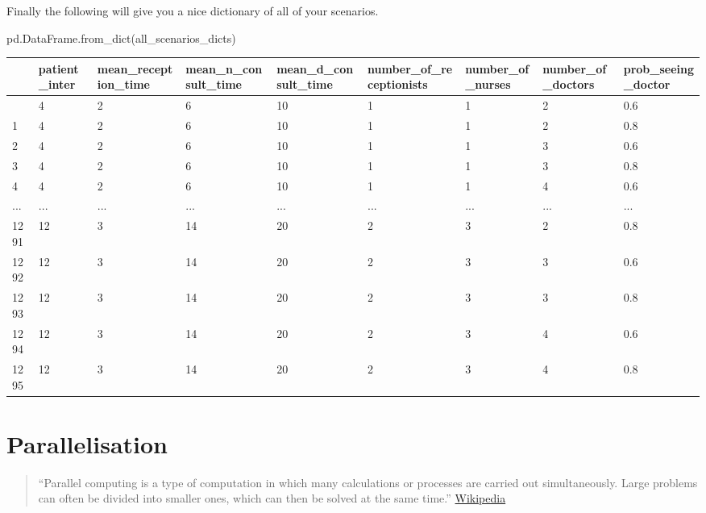 \documentclass[
  letterpaper,
  DIV=11,
  numbers=noendperiod]{scrreprt}
\newenvironment{Shaded}{}{}
\newcommand{\NormalTok}[1]{\textcolor[rgb]{0.14,0.16,0.18}{#1}}
\begin{document}
Finally the following will give you a nice dictionary of all of your
scenarios.

\begin{Shaded}
\begin{Highlighting}[]
\NormalTok{pd.DataFrame.from\_dict(all\_scenarios\_dicts)}
\end{Highlighting}
\end{Shaded}

\begin{longtable}[]{@{}lllllllll@{}}
\toprule\noalign{}
& patient\_inter & mean\_reception\_time & mean\_n\_consult\_time &
mean\_d\_consult\_time & number\_of\_receptionists & number\_of\_nurses
& number\_of\_doctors & prob\_seeing\_doctor \\
\midrule\noalign{}
\endhead
\bottomrule\noalign{}
\endlastfoot
0 & 4 & 2 & 6 & 10 & 1 & 1 & 2 & 0.6 \\
1 & 4 & 2 & 6 & 10 & 1 & 1 & 2 & 0.8 \\
2 & 4 & 2 & 6 & 10 & 1 & 1 & 3 & 0.6 \\
3 & 4 & 2 & 6 & 10 & 1 & 1 & 3 & 0.8 \\
4 & 4 & 2 & 6 & 10 & 1 & 1 & 4 & 0.6 \\
... & ... & ... & ... & ... & ... & ... & ... & ... \\
1291 & 12 & 3 & 14 & 20 & 2 & 3 & 2 & 0.8 \\
1292 & 12 & 3 & 14 & 20 & 2 & 3 & 3 & 0.6 \\
1293 & 12 & 3 & 14 & 20 & 2 & 3 & 3 & 0.8 \\
1294 & 12 & 3 & 14 & 20 & 2 & 3 & 4 & 0.6 \\
1295 & 12 & 3 & 14 & 20 & 2 & 3 & 4 & 0.8 \\
\end{longtable}

\chapter{Parallelisation}\label{parallelisation}

\begin{quote}
``Parallel computing is a type of computation in which many calculations
or processes are carried out simultaneously. Large problems can often be
divided into smaller ones, which can then be solved at the same time.''
\href{https://en.wikipedia.org/wiki/Parallel_computing}{Wikipedia}
\end{quote}
\end{document}
